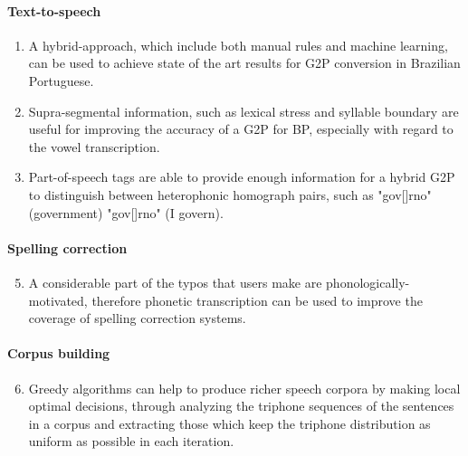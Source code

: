 \paragraph*{Text-to-speech}
  \begin{enumerate}
    \item A hybrid-approach, which include both manual rules and machine learning, can be used to achieve state of the art results for \ac{G2P} conversion in Brazilian Portuguese.
    \item Supra-segmental information, such as lexical stress and syllable boundary are useful for improving the accuracy of a \ac{G2P} for \ac{BP}, especially with regard to the vowel transcription.
    \item Part-of-speech tags are able to provide enough information for a hybrid \ac{G2P} to distinguish between heterophonic homograph pairs, such as "gov[]rno" (government) "gov[]rno" (I govern).
  \end{enumerate}

\paragraph*{Spelling correction}
  \begin{enumerate}
    \setcounter{enumi}{4}
    \item A considerable part of the typos that users make are phonologically-motivated, therefore phonetic transcription can be used to improve the coverage of spelling correction systems.
  \end{enumerate}

\paragraph*{Corpus building}
  \begin{enumerate}
    \setcounter{enumi}{5}
    \item Greedy algorithms can help to produce richer speech corpora by making local optimal decisions, through analyzing the triphone sequences of the sentences in a corpus and extracting those which keep the triphone distribution as uniform as possible in each iteration.
  \end{enumerate}

